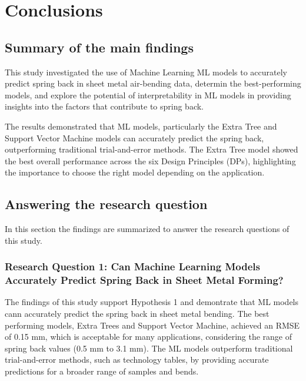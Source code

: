 \chapter{Conclusions}\label{ch:conclusions}


\section{Summary of the main findings}\label{subsec:summary-of-the-main-findings}
This study investigated the use of Machine Learning \ac{ML} models to accurately predict spring back in sheet metal
air-bending data, determin the best-performing models, and explore the potential of interpretability in ML models in
providing insights into the factors that contribute to spring back.

The results demonstrated that ML models, particularly the Extra Tree and Support Vector Machine models can accurately
predict the spring back, outperforming traditional trial-and-error methods.
The Extra Tree model showed the best overall performance across the six Design Principles (DPs), highlighting the
importance to choose the right model depending on the application.


\section{Answering the research question}\label{sec:answering-the-research-question}
In this section the findings are summarized to answer the research questions of this study.

\subsection{Research Question 1: Can Machine Learning Models Accurately Predict Spring Back in Sheet Metal Forming?}
\label{subsec:research-question-1:-can-machine-learning-models-accurately-predict-spring-back-in-sheet-metal-forming?}

The findings of this study support Hypothesis 1 and demontrate that \ac{ML} models cann accurately predict the spring
back in sheet metal bending.
The best performing models, Extra Trees and Support Vector Machine, achieved an RMSE of 0.15 mm, which is acceptable
for many applications, considering the range of spring back values (0.5 mm to 3.1 mm).
The \ac{ML} models outperform traditional trial-and-error methods, such as technology tables, by providing accurate
predictions for a broader range of samples and bends.

